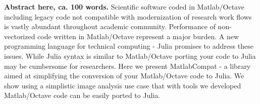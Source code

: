 \textbf{Abstract here, ca. 100 words.}
Scientific software coded in Matlab/Octave including legacy code not compatible with modernization of research work flows is vastly abundant throughout academic community. Performance of non-vectorized code written in Matlab/Octave represent a major burden. A new programming language for technical computing - Julia promises to address these issues. While Julia syntax is similar to Matlab/Octave porting your code to Julia may be cumbersome for researchers. Here we present MatlabCompat - a library aimed at simplifying the conversion of your Matlab/Octave code to Julia. We show using a simplistic image analysis use case that with tools we developed Matlab/Octave code can be easily ported to Julia.
  